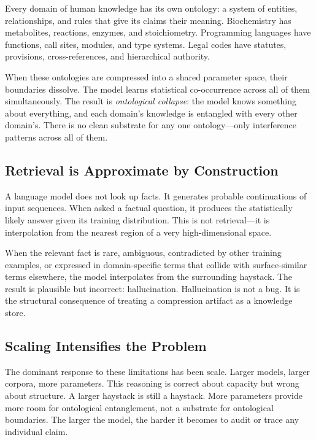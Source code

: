 \documentclass{article}
\begin{document}
Every domain of human knowledge has its own ontology: a system of entities,
relationships, and rules that give its claims their meaning.  Biochemistry has
metabolites, reactions, enzymes, and stoichiometry.  Programming languages have
functions, call sites, modules, and type systems.  Legal codes have statutes,
provisions, cross-references, and hierarchical authority.

When these ontologies are compressed into a shared parameter space, their
boundaries dissolve.  The model learns statistical co-occurrence across all of
them simultaneously.  The result is \emph{ontological collapse}: the model
knows something about everything, and each domain's knowledge is entangled with
every other domain's.  There is no clean substrate for any one ontology---only
interference patterns across all of them.

\subsection{Retrieval is Approximate by Construction}

A language model does not look up facts.  It generates probable continuations of
input sequences.  When asked a factual question, it produces the statistically
likely answer given its training distribution.  This is not retrieval---it is
interpolation from the nearest region of a very high-dimensional space.

When the relevant fact is rare, ambiguous, contradicted by other training
examples, or expressed in domain-specific terms that collide with
surface-similar terms elsewhere, the model interpolates from the surrounding
haystack.  The result is plausible but incorrect: hallucination.  Hallucination
is not a bug.  It is the structural consequence of treating a compression
artifact as a knowledge store.

\subsection{Scaling Intensifies the Problem}

The dominant response to these limitations has been scale.  Larger models,
larger corpora, more parameters.  This reasoning is correct about capacity but
wrong about structure.  A larger haystack is still a haystack.  More parameters
provide more room for ontological entanglement, not a substrate for ontological
boundaries.  The larger the model, the harder it becomes to audit or trace any
individual claim.
\end{document}
